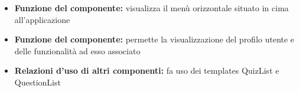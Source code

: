 			\begin{itemize}
				\item\textbf{Funzione del componente:} visualizza il menù orizzontale situato in cima all'applicazione
			\end{itemize}
			\begin{itemize}
				\item\textbf{Funzione del componente:} permette la visualizzazione del profilo utente e delle funzionalità ad esso associato
				\item\textbf{Relazioni d'uso di altri componenti:} fa uso dei templates QuizList e QuestionList 
			\end{itemize}			
					
			\newpage
